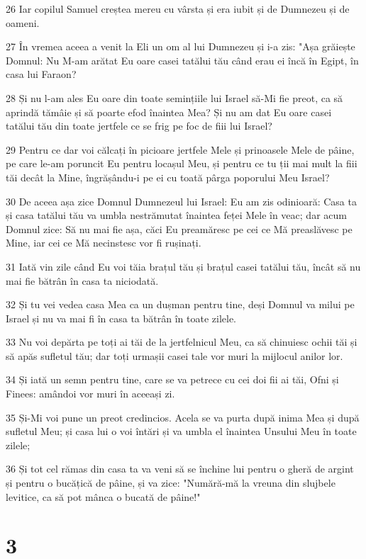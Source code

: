 \par 26 Iar copilul Samuel creștea mereu cu vârsta și era iubit și de Dumnezeu și de oameni.
\par 27 În vremea aceea a venit la Eli un om al lui Dumnezeu și i-a zis: "Așa grăiește Domnul: Nu M-am arătat Eu oare casei tatălui tău când erau ei încă în Egipt, în casa lui Faraon?
\par 28 Și nu l-am ales Eu oare din toate semințiile lui Israel să-Mi fie preot, ca să aprindă tămâie și să poarte efod înaintea Mea? Și nu am dat Eu oare casei tatălui tău din toate jertfele ce se frig pe foc de fiii lui Israel?
\par 29 Pentru ce dar voi călcați în picioare jertfele Mele și prinoasele Mele de pâine, pe care le-am poruncit Eu pentru locașul Meu, și pentru ce tu ții mai mult la fiii tăi decât la Mine, îngrășându-i pe ei cu toată pârga poporului Meu Israel?
\par 30 De aceea așa zice Domnul Dumnezeul lui Israel: Eu am zis odinioară: Casa ta și casa tatălui tău va umbla nestrămutat înaintea feței Mele în veac; dar acum Domnul zice: Să nu mai fie așa, căci Eu preamăresc pe cei ce Mă preaslăvesc pe Mine, iar cei ce Mă necinstesc vor fi rușinați.
\par 31 Iată vin zile când Eu voi tăia brațul tău și brațul casei tatălui tău, încât să nu mai fie bătrân în casa ta niciodată.
\par 32 Și tu vei vedea casa Mea ca un dușman pentru tine, deși Domnul va milui pe Israel și nu va mai fi în casa ta bătrân în toate zilele.
\par 33 Nu voi depărta pe toți ai tăi de la jertfelnicul Meu, ca să chinuiesc ochii tăi și să apăs sufletul tău; dar toți urmașii casei tale vor muri la mijlocul anilor lor.
\par 34 Și iată un semn pentru tine, care se va petrece cu cei doi fii ai tăi, Ofni și Finees: amândoi vor muri în aceeași zi.
\par 35 Și-Mi voi pune un preot credincios. Acela se va purta după inima Mea și după sufletul Meu; și casa lui o voi întări și va umbla el înaintea Unsului Meu în toate zilele;
\par 36 Și tot cel rămas din casa ta va veni să se închine lui pentru o gheră de argint și pentru o bucățică de pâine, și va zice: "Numără-mă la vreuna din slujbele levitice, ca să pot mânca o bucată de pâine!"

\chapter{3}

